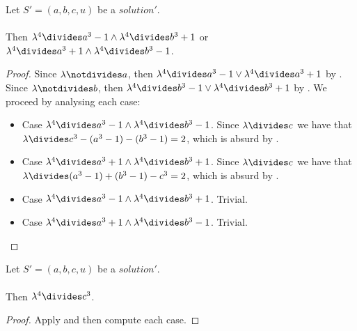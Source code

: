 \begin{lemma}
  \label{lmm:a_cube_b_cube_same_congr}
  \leanok
  Let $S'=(a, b, c, u)$ be a $solution'$. \\\\
  Then $\lambda^4 \divides a^3 - 1 \land \lambda^4 \divides b^3 + 1$ or
  $\lambda^4 \divides a^3 + 1 \land \lambda^4 \divides b^3 - 1$.
\end{lemma}
\begin{proof}
  \leanok
  Since $\lambda \notdivides a$, then
  $\lambda^4 \divides a^3 - 1 \lor \lambda^4 \divides a^3 + 1$ by
  .
  Since $\lambda \notdivides b$, then
  $\lambda^4 \divides b^3 - 1 \lor \lambda^4 \divides b^3 + 1$ by
  .
  We proceed by analysing each case:
  \begin{itemize}
      \item Case $\lambda^4 \divides a^3 - 1 \land \lambda^4 \divides b^3 - 1$.
      Since $\lambda \divides c$ we have that $\lambda \divides c^3-(a^3-1)-(b^3-1) = 2$,
      which is absurd by .
      \item Case $\lambda^4 \divides a^3 + 1 \land \lambda^4 \divides b^3 + 1$.
      Since $\lambda \divides c$ we have that $\lambda \divides (a^3-1)+(b^3-1)-c^3 = 2$,
      which is absurd by .
      \item Case $\lambda^4 \divides a^3 - 1 \land \lambda^4 \divides b^3 + 1$. Trivial.
      \item Case $\lambda^4 \divides a^3 + 1 \land \lambda^4 \divides b^3 - 1$. Trivial.
  \end{itemize}
\end{proof}

\begin{lemma}
  \label{lmm:lambda_pow_four_dvd_c_cube}
  \leanok
  Let $S'=(a, b, c, u)$ be a $solution'$. \\\\
  Then $\lambda^4 \divides c^3$.
\end{lemma}
\begin{proof}
  \leanok
  Apply  and then compute each case.
\end{proof}

